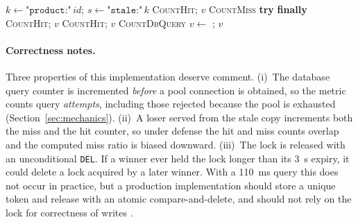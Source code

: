 \documentclass[preprint,12pt]{elsarticle}
\begin{document}
\begin{algorithm}[t]
\caption{Product read path with single-flight locking and stale-while-revalidate}
\label{alg:read}
\begin{algorithmic}[1]
  \State $k \gets \texttt{"product:"}\,id$; \quad $s \gets \texttt{"stale:"}\,k$
   \State \textsc{CountHit}; \Return $v$ \EndIf
  \State \textsc{CountMiss}
   \State \Return {} \EndIf
   
     \State \textbf{try} \Return {} \textbf{finally} 
  \EndIf
   \State \textsc{CountHit}; \Return $v$ \EndIf
   
     \State {}
      \State \textsc{CountHit}; \Return $v$ \EndIf
  \EndFor
  \State \Return {}
\EndFunction
\Statex
{}
  \State \textsc{CountDbQuery}
  \State $v \gets$  
  \State {}; 
  \State \Return $v$
\EndFunction
\end{algorithmic}
\end{algorithm}

\paragraph{Correctness notes.} Three properties of this implementation deserve comment.
(i)~The database query counter is incremented \emph{before} a pool connection is
obtained, so the metric counts query \emph{attempts}, including those rejected because
the pool is exhausted (Section~\ref{sec:mechanics}). (ii)~A loser served from the stale
copy increments both the miss and the hit counter, so under defense the hit and miss
counts overlap and the computed miss ratio is biased downward. (iii)~The lock is
released with an unconditional \texttt{DEL}. If a winner ever held the lock longer than
its 3~s expiry, it could delete a lock acquired by a later winner. With a 110~ms query
this does not occur in practice, but a production implementation should store a unique
token and release with an atomic compare-and-delete, and should not rely on the lock
for correctness of writes \cite{kleppmann2016}.
\end{document}
